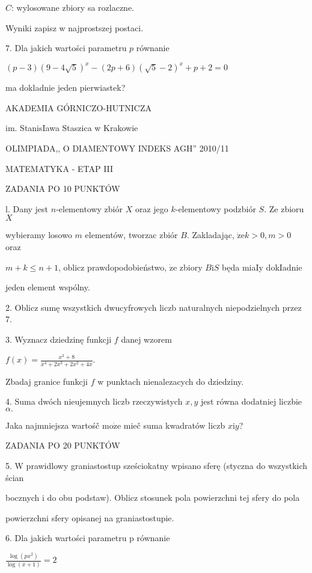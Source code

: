 \documentclass[a4paper,12pt]{article}
\begin{document}
$C$: wylosowane zbiory sa rozlaczne.

Wyniki zapisz w najprostszej postaci.

7. Dla jakich wartości parametru $p$ równanie

$(p-3)(9-4\sqrt{5})^{x}-(2p+6)(\sqrt{5}-2)^{x}+p+2=0$

ma dokladnie jeden pierwiastek?






AKADEMIA GÓRNICZO-HUTNICZA

im. StanisIawa Staszica w Krakowie

OLIMPIADA,, O DIAMENTOWY INDEKS AGH'' 2010/11

MATEMATYKA - ETAP III

ZADANIA PO 10 PUNKTÓW

l. Dany jest $n$-elementowy zbiór $X$ oraz jego $k$-elementowy podzbiór $S$. Ze zbioru $X$

wybieramy losowo $m$ elementów, tworzac zbiór $B$. Zakladając, $\dot{\mathrm{z}}\mathrm{e}k>0, m>0$ oraz

$m+k\leq n+1$, oblicz prawdopodobieństwo, $\dot{\mathrm{z}}\mathrm{e}$ zbiory $B\mathrm{i}S$ będa miaIy dokIadnie

jeden element wspólny.

2. Oblicz sumę wszystkich dwucyfrowych liczb naturalnych niepodzielnych przez 7.

3. Wyznacz dziedzinę funkcji $f$ danej wzorem

$f(x)=\displaystyle \frac{x^{3}+8}{x^{4}+2x^{3}+2x^{2}+4x}.$

Zbadaj granice funkcji $f$ w punktach nienalezacych do dziedziny.

4. Suma dwóch nieujemnych liczb rzeczywistych $x, y$ jest równa dodatniej liczbie $\alpha.$

Jaka najmniejsza wartośč $\mathrm{m}\mathrm{o}\dot{\mathrm{z}}\mathrm{e}$ mieč suma kwadratów liczb $x\mathrm{i}y$?

ZADANIA PO 20 PUNKTÓW

5. W prawidlowy graniastostup sześciokatny wpisano sferę (styczna do wszystkich ścian

bocznych i do obu podstaw). Oblicz stosunek pola powierzchni tej sfery do pola

powierzchni sfery opisanej na graniastostupie.

6. Dla jakich wartości parametru p równanie

$\displaystyle \frac{\log(px^{2})}{\log(x+1)}=2$
\end{document}
